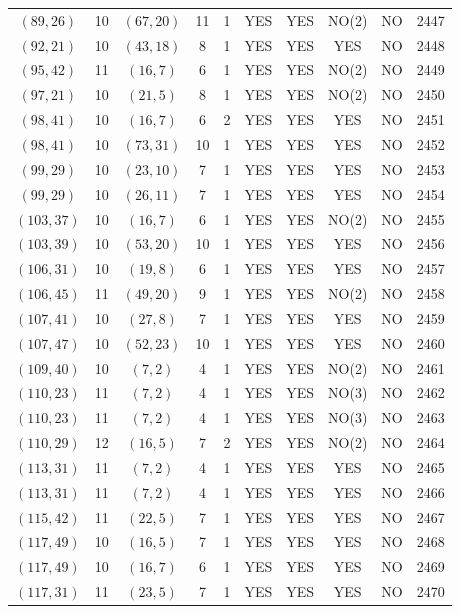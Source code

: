 \begin{longtable}{|c|c|c|c|c|c|c|c|c|c|}
$(89, 26)$ & 10 & $(67, 20)$ & 11 & 1 & YES & YES & NO(2) & NO & 2447\\
$(92, 21)$ & 10 & $(43, 18)$ & 8 & 1 & YES & YES & YES & NO & 2448\\
$(95, 42)$ & 11 & $(16, 7)$ & 6 & 1 & YES & YES & NO(2) & NO & 2449\\
$(97, 21)$ & 10 & $(21, 5)$ & 8 & 1 & YES & YES & NO(2) & NO & 2450\\
$(98, 41)$ & 10 & $(16, 7)$ & 6 & 2 & YES & YES & YES & NO & 2451\\
$(98, 41)$ & 10 & $(73, 31)$ & 10 & 1 & YES & YES & YES & NO & 2452\\
$(99, 29)$ & 10 & $(23, 10)$ & 7 & 1 & YES & YES & YES & NO & 2453\\
$(99, 29)$ & 10 & $(26, 11)$ & 7 & 1 & YES & YES & YES & NO & 2454\\
$(103, 37)$ & 10 & $(16, 7)$ & 6 & 1 & YES & YES & NO(2) & NO & 2455\\
$(103, 39)$ & 10 & $(53, 20)$ & 10 & 1 & YES & YES & YES & NO & 2456\\
$(106, 31)$ & 10 & $(19, 8)$ & 6 & 1 & YES & YES & YES & NO & 2457\\
$(106, 45)$ & 11 & $(49, 20)$ & 9 & 1 & YES & YES & NO(2) & NO & 2458\\
$(107, 41)$ & 10 & $(27, 8)$ & 7 & 1 & YES & YES & YES & NO & 2459\\
$(107, 47)$ & 10 & $(52, 23)$ & 10 & 1 & YES & YES & YES & NO & 2460\\
$(109, 40)$ & 10 & $(7, 2)$ & 4 & 1 & YES & YES & NO(2) & NO & 2461\\
$(110, 23)$ & 11 & $(7, 2)$ & 4 & 1 & YES & YES & NO(3) & NO & 2462\\
$(110, 23)$ & 11 & $(7, 2)$ & 4 & 1 & YES & YES & NO(3) & NO & 2463\\
$(110, 29)$ & 12 & $(16, 5)$ & 7 & 2 & YES & YES & NO(2) & NO & 2464\\
$(113, 31)$ & 11 & $(7, 2)$ & 4 & 1 & YES & YES & YES & NO & 2465\\
$(113, 31)$ & 11 & $(7, 2)$ & 4 & 1 & YES & YES & YES & NO & 2466\\
$(115, 42)$ & 11 & $(22, 5)$ & 7 & 1 & YES & YES & YES & NO & 2467\\
$(117, 49)$ & 10 & $(16, 5)$ & 7 & 1 & YES & YES & YES & NO & 2468\\
$(117, 49)$ & 10 & $(16, 7)$ & 6 & 1 & YES & YES & YES & NO & 2469\\
$(117, 31)$ & 11 & $(23, 5)$ & 7 & 1 & YES & YES & YES & NO & 2470\\

\end{longtable}
